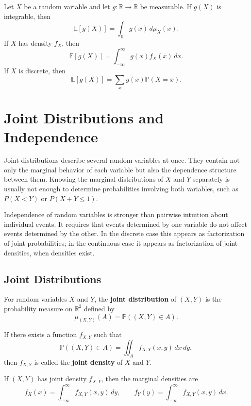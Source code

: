 \begin{theorem}
Let $X$ be a random variable and let $g:\mathbb{R}\to\mathbb{R}$ be measurable. If $g(X)$ is integrable, then
\[
    \mathbb{E}[g(X)]=\int_{\mathbb{R}}g(x)\,d\mu_X(x).
\]
If $X$ has density $f_X$, then
\[
    \mathbb{E}[g(X)]=\int_{-\infty}^{\infty}g(x)f_X(x)\,dx.
\]
If $X$ is discrete, then
\[
    \mathbb{E}[g(X)]=\sum_x g(x)\mathbb{P}(X=x).
\]
\end{theorem}

\section{Joint Distributions and Independence}


Joint distributions describe several random variables at once. They contain not only the marginal behavior of each variable but also the dependence structure between them. Knowing the marginal distributions of $X$ and $Y$ separately is usually not enough to determine probabilities involving both variables, such as $P(X<Y)$ or $P(X+Y\leq 1)$.

Independence of random variables is stronger than pairwise intuition about individual events. It requires that events determined by one variable do not affect events determined by the other. In the discrete case this appears as factorization of joint probabilities; in the continuous case it appears as factorization of joint densities, when densities exist.

\subsection{Joint Distributions}

\begin{definition}
For random variables $X$ and $Y$, the \textbf{joint distribution} of $(X,Y)$ is the probability measure on $\mathbb{R}^2$ defined by
\[
    \mu_{(X,Y)}(A)=\mathbb{P}((X,Y)\in A).
\]
\end{definition}

\begin{definition}
If there exists a function $f_{X,Y}$ such that
\[
    \mathbb{P}((X,Y)\in A)=\iint_A f_{X,Y}(x,y)\,dx\,dy,
\]
then $f_{X,Y}$ is called the \textbf{joint density} of $X$ and $Y$.
\end{definition}

\begin{definition}
If $(X,Y)$ has joint density $f_{X,Y}$, then the marginal densities are
\[
    f_X(x)=\int_{-\infty}^{\infty}f_{X,Y}(x,y)\,dy,
    \qquad
    f_Y(y)=\int_{-\infty}^{\infty}f_{X,Y}(x,y)\,dx.
\]
\end{definition}

